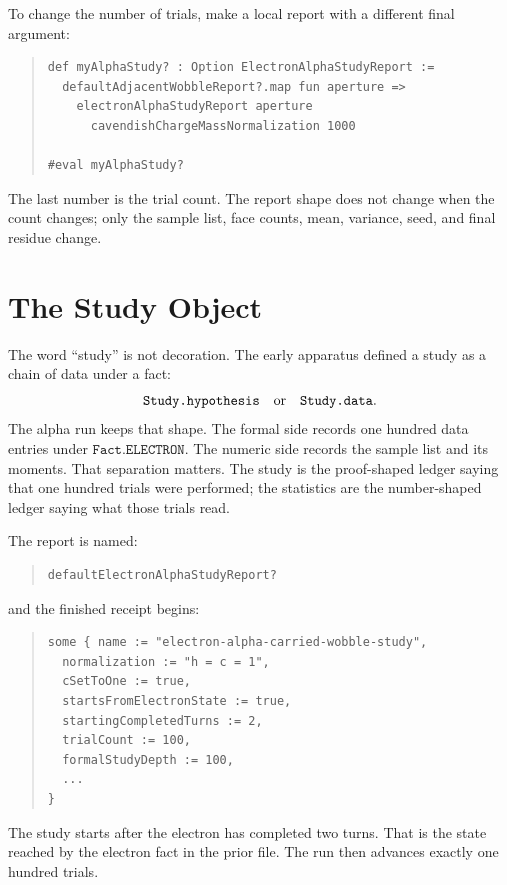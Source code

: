 To change the number of trials, make a local report with a different final argument:
\begin{quote}\small
\begin{verbatim}
def myAlphaStudy? : Option ElectronAlphaStudyReport :=
  defaultAdjacentWobbleReport?.map fun aperture =>
    electronAlphaStudyReport aperture
      cavendishChargeMassNormalization 1000

#eval myAlphaStudy?
\end{verbatim}
\end{quote}
The last number is the trial count. The report shape does not change when the count changes; only the sample
list, face counts, mean, variance, seed, and final residue change.

\section{The Study Object}

The word ``study'' is not decoration. The early apparatus defined a study as a chain of data under a fact:
\[
  \texttt{Study.hypothesis}
  \quad\hbox{or}\quad
  \texttt{Study.data}.
\]
The alpha run keeps that shape. The formal side records one hundred data entries under
\(\texttt{Fact.ELECTRON}\). The numeric side records the sample list and its moments. That separation matters.
The study is the proof-shaped ledger saying that one hundred trials were performed; the statistics are the
number-shaped ledger saying what those trials read.

The report is named:
\begin{quote}\small
\begin{verbatim}
defaultElectronAlphaStudyReport?
\end{verbatim}
\end{quote}
and the finished receipt begins:
\begin{quote}\small
\begin{verbatim}
some { name := "electron-alpha-carried-wobble-study",
  normalization := "h = c = 1",
  cSetToOne := true,
  startsFromElectronState := true,
  startingCompletedTurns := 2,
  trialCount := 100,
  formalStudyDepth := 100,
  ...
}
\end{verbatim}
\end{quote}
The study starts after the electron has completed two turns. That is the state reached by the electron fact in
the prior file. The run then advances exactly one hundred trials.

